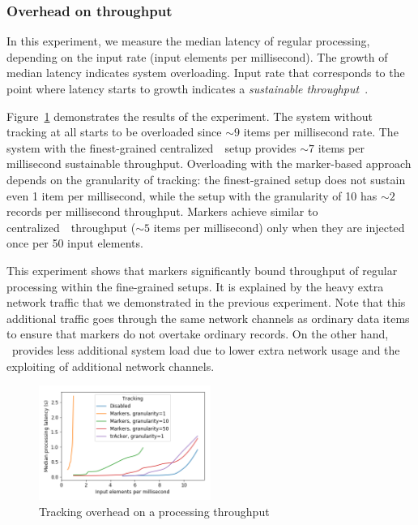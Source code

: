 
\subsubsection{Overhead on throughput}

In this experiment, we measure the median latency of regular processing, depending on the input rate (input elements per millisecond). The growth of median latency indicates system overloading. Input rate that corresponds to the point where latency starts to growth indicates a {\em sustainable throughput}~\cite{karimov2018benchmarking}.

Figure~\ref{throughput_overhead} demonstrates the results of the experiment. The system without tracking at all starts to be overloaded since $\sim 9$ items per millisecond rate. The system with the finest-grained centralized~\tracker\ setup provides $\sim 7$ items per millisecond sustainable throughput. Overloading with the marker-based approach depends on the granularity of tracking: the finest-grained setup does not sustain even 1 item per millisecond, while the setup with the granularity of 10 has $\sim 2$ records per millisecond throughput. Markers achieve similar to centralized~\tracker\ throughput ($\sim 5$ items per millisecond) only when they are injected once per 50 input elements.

This experiment shows that markers significantly bound throughput of regular processing within the fine-grained setups. It is explained by the heavy extra network traffic that we demonstrated in the previous experiment. Note that this additional traffic goes through the same network channels as ordinary data items to ensure that markers do not overtake ordinary records. On the other hand, \tracker\ provides less additional system load due to lower extra network usage and the exploiting of additional network channels.


\begin{figure}[htbp]
  \centering
  \includegraphics[width=0.50\textwidth]{pics/throughput_overhead_50.png}
  \caption{Tracking overhead on a processing throughput}
  \label{throughput_overhead}
\end{figure}


